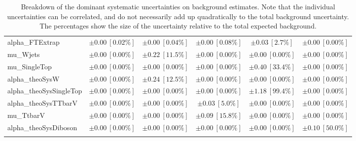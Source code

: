 \begin{sidewaystable}
\begin{center}
\begin{tabular*}{\textwidth}{@{\extracolsep{\fill}}lccccc}
alpha\_FTExtrap         & $\pm 0.00\ [0.02\%] $          & $\pm 0.00\ [0.04\%] $          & $\pm 0.00\ [0.08\%] $          & $\pm 0.03\ [2.7\%] $          & $\pm 0.00\ [0.00\%] $       \\
mu\_Wjets         & $\pm 0.00\ [0.00\%] $          & $\pm 0.22\ [11.5\%] $          & $\pm 0.00\ [0.00\%] $          & $\pm 0.00\ [0.00\%] $          & $\pm 0.00\ [0.00\%] $       \\
mu\_SingleTop         & $\pm 0.00\ [0.00\%] $          & $\pm 0.00\ [0.00\%] $          & $\pm 0.00\ [0.00\%] $          & $\pm 0.40\ [33.4\%] $          & $\pm 0.00\ [0.00\%] $       \\
alpha\_theoSysW         & $\pm 0.00\ [0.00\%] $          & $\pm 0.24\ [12.5\%] $          & $\pm 0.00\ [0.00\%] $          & $\pm 0.00\ [0.00\%] $          & $\pm 0.00\ [0.00\%] $       \\
alpha\_theoSysSingleTop         & $\pm 0.00\ [0.00\%] $          & $\pm 0.00\ [0.00\%] $          & $\pm 0.00\ [0.00\%] $          & $\pm 1.18\ [99.4\%] $          & $\pm 0.00\ [0.00\%] $       \\
alpha\_theoSysTTbarV         & $\pm 0.00\ [0.00\%] $          & $\pm 0.00\ [0.00\%] $          & $\pm 0.03\ [5.0\%] $          & $\pm 0.00\ [0.00\%] $          & $\pm 0.00\ [0.00\%] $       \\
mu\_TtbarV         & $\pm 0.00\ [0.00\%] $          & $\pm 0.00\ [0.00\%] $          & $\pm 0.09\ [15.8\%] $          & $\pm 0.00\ [0.00\%] $          & $\pm 0.00\ [0.00\%] $       \\
alpha\_theoSysDiboson         & $\pm 0.00\ [0.00\%] $          & $\pm 0.00\ [0.00\%] $          & $\pm 0.00\ [0.00\%] $          & $\pm 0.00\ [0.00\%] $          & $\pm 0.10\ [50.0\%] $       \\
\noalign{\smallskip}\hline\noalign{\smallskip}
\end{tabular*}
\end{center}
\caption[Breakdown of uncertainty on background estimates]{
Breakdown of the dominant systematic uncertainties on background estimates.
Note that the individual uncertainties can be correlated, and do not necessarily add up quadratically to 
the total background uncertainty. The percentages show the size of the uncertainty relative to the total expected background.
\label{table.results.bkgestimate.uncertainties.SRC2_bybkg}}
\end{sidewaystable}
%